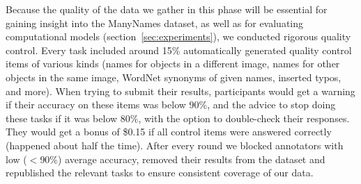 Because the quality of the data we gather in this phase will be essential for gaining insight into the ManyNames dataset, as well as for evaluating computational models (section~\ref{sec:experiments}), we conducted rigorous quality control.
Every task included around 15\% automatically generated quality control items of various kinds (names for objects in a different image, names for other objects in the same image, WordNet synonyms of given names, inserted typos, and more).
When trying to submit their results, participants would get a warning if their accuracy on these items was below 90\%, and the advice to stop doing these tasks if it was below 80\%, with the option to double-check their responses.
They would get a bonus of \$0.15 if all control items were answered correctly (happened about half the time).
After every round we blocked annotators with low ($<$90\%) average accuracy, removed their results from the dataset and republished the relevant tasks to ensure consistent coverage of our data.

